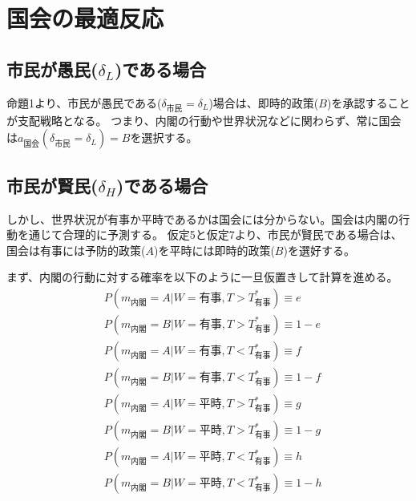 \documentclass[main.tex]{subfiles}
\begin{document}
\section{国会の最適反応}


\subsection{市民が愚民($\delta_L$)である場合}

命題1より、市民が愚民である($\delta_{市民} = \delta_L$)場合は、即時的政策($B$)を承認することが支配戦略となる。
つまり、内閣の行動や世界状況などに関わらず、常に国会は$a_{国会}(\delta_{市民}=\delta_L)=B$を選択する。



\subsection{市民が賢民($\delta_H$)である場合}

しかし、世界状況が有事か平時であるかは国会には分からない。国会は内閣の行動を通じて合理的に予測する。
仮定5と仮定7より、市民が賢民である場合は、国会は有事には予防的政策($A$)を平時には即時的政策($B$)を選好する。

まず、内閣の行動に対する確率を以下のように一旦仮置きして計算を進める。
\begin{align*}
    & P(m_{内閣} = A| W = {有事}, T > T^*_{有事}) \equiv e \\
    & P(m_{内閣} = B| W = {有事}, T > T^*_{有事} ) \equiv 1-e \\
    & P(m_{内閣} = A| W = {有事}, T < T^*_{有事}) \equiv f \\
    & P(m_{内閣} = B| W = {有事}, T < T^*_{有事} ) \equiv 1-f \\
    & P(m_{内閣} = A| W = {平時}, T > T^*_{有事}) \equiv g \\
    & P(m_{内閣} = B| W = {平時}, T > T^*_{有事} ) \equiv 1-g \\
    & P(m_{内閣} = A| W = {平時}, T < T^*_{有事}) \equiv h \\
    & P(m_{内閣} = B| W = {平時}, T < T^*_{有事} ) \equiv 1-h
\end{align*}
\end{document}
